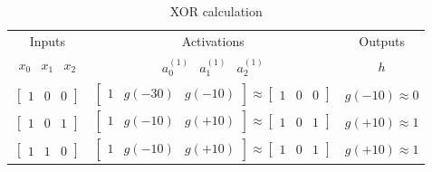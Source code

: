 \begin{itemize}
    \begin{table}[H]
        \renewcommand\arraystretch{1.5}
        \caption{XOR calculation}
        \centering
        \begin{tabular}{ccc}
            \hline\hline %
            Inputs                                                     & Activations                                                                                                                         & Outputs            \\ 
            $\begin{array}{ccc} x_0 & x_1 & x_2 \end{array}$           & $\begin{array}{ccc} a^{(1)}_0 & a^{(1)}_1 & a^{(1)}_2 \end{array}$                                                                  & $h$                \\ 
            \hline %
            $\left[{\begin{array}{ccc} 1 & 0 & 0 \end{array}}\right]$  & $\left[{\begin{array}{ccc} 1 & g(-30) & g(-10) \end{array}}\right] \approx \left[{\begin{array}{ccc} 1 & 0 & 0 \end{array}}\right]$ & $g(-10) \approx 0$ \\ 
            $\left[{\begin{array}{ccc} 1 & 0 & 1 \end{array}}\right]$  & $\left[{\begin{array}{ccc} 1 & g(-10) & g(+10) \end{array}}\right] \approx \left[{\begin{array}{ccc} 1 & 0 & 1 \end{array}}\right]$ & $g(+10) \approx 1$ \\
            $\left[{\begin{array}{ccc} 1 & 1 & 0 \end{array}}\right]$  & $\left[{\begin{array}{ccc} 1 & g(-10) & g(+10) \end{array}}\right] \approx \left[{\begin{array}{ccc} 1 & 0 & 1 \end{array}}\right]$ & $g(+10) \approx 1$ \\

\end{tabular}
\end{table}
\end{itemize}
